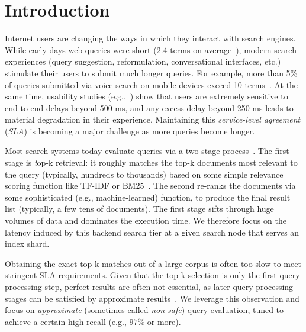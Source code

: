 \section{Introduction}
\label{sec:intro}

Internet users are changing the ways in which they interact with search engines. 
While  early days web queries were short (2.4 terms on average~\cite{Spink:2001:SWP:362968.362979}), 
modern search experiences (query suggestion, reformulation, conversational interfaces, etc.) stimulate their users to submit much longer queries. 
For example, more than 5\% of queries submitted via voice search on mobile devices exceed 10 terms~\cite{sigir/Guy16}. 
At the same time, usability studies
(e.g.,~\cite{Arapakis:2014:IRL:2600428.2609627}) show that users are extremely sensitive to end-to-end delays beyond 500 ms, 
and any excess delay beyond 250 ms leads to material degradation in their experience. Maintaining this \emph{service-level agreement} ({\em SLA}) 
is becoming a major challenge as more queries become longer.

 Most search systems today evaluate queries via a two-stage process~\cite{Wang:2011}. 
The first stage is {\emph top-k retrieval}: it 
 roughly matches the top-k documents most relevant to the query (typically, hundreds to thousands) based on some simple relevance scoring function like TF-IDF or BM25~\cite{Baeza-Yates:1999:MIR:553876}. The second  re-ranks the  documents via some sophisticated (e.g., machine-learned) function, to produce the final result list (typically, a few tens of documents). 
The first stage  sifts through huge volumes of data and dominates the execution time. 
We therefore focus on the latency induced by this backend search tier at a given search node that serves an index shard.

Obtaining the exact top-k matches out of a large corpus is often too slow to meet stringent SLA requirements. 
Given that the top-k selection is only the first query  processing step, perfect results are often not essential, as later query processing 
stages can be satisfied by approximate results~\cite{Lin:2015}. We leverage this observation and focus on \emph{approximate} 
(sometimes called \emph{non-safe}) query evaluation, tuned to achieve a certain high recall (e.g., $97\%$ or more). 

